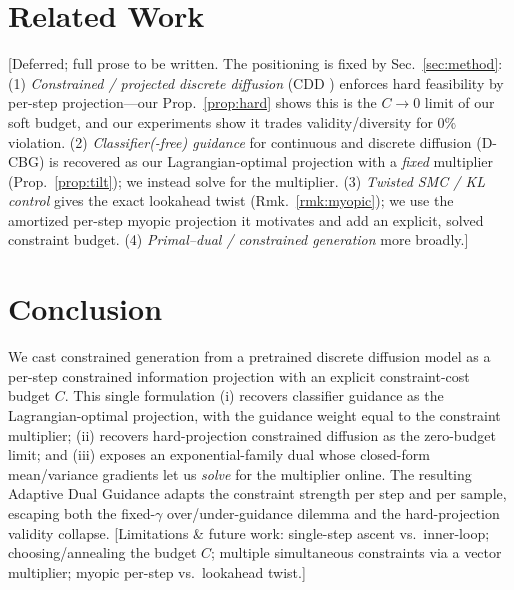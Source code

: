 \documentclass{article}
\newcommand{\todo}[1]{{\color{red}[#1]}}
\begin{document}
\section{Related Work}
\todo{Deferred; full prose to be written. The positioning is fixed by Sec.~\ref{sec:method}: (1) \emph{Constrained / projected discrete diffusion} (CDD \cite{cardei2025cdd}) enforces hard feasibility by per-step projection---our Prop.~\ref{prop:hard} shows this is the $C\to0$ limit of our soft budget, and our experiments show it trades validity/diversity for $0\%$ violation. (2) \emph{Classifier(-free) guidance} for continuous and discrete diffusion (D-CBG) is recovered as our Lagrangian-optimal projection with a \emph{fixed} multiplier (Prop.~\ref{prop:tilt}); we instead solve for the multiplier. (3) \emph{Twisted SMC / KL control} \cite{wu2023practical,zhao2024probabilistic} gives the exact lookahead twist (Rmk.~\ref{rmk:myopic}); we use the amortized per-step myopic projection it motivates and add an explicit, solved constraint budget. (4) \emph{Primal--dual / constrained generation} more broadly.}

\section{Conclusion}
We cast constrained generation from a pretrained discrete diffusion model as a per-step constrained information projection with an explicit constraint-cost budget $C$. This single formulation (i) recovers classifier guidance as the Lagrangian-optimal projection, with the guidance weight equal to the constraint multiplier; (ii) recovers hard-projection constrained diffusion as the zero-budget limit; and (iii) exposes an exponential-family dual whose closed-form mean/variance gradients let us \emph{solve} for the multiplier online. The resulting Adaptive Dual Guidance adapts the constraint strength per step and per sample, escaping both the fixed-$\gamma$ over/under-guidance dilemma and the hard-projection validity collapse. \todo{Limitations \& future work: single-step ascent vs.\ inner-loop; choosing/annealing the budget $C$; multiple simultaneous constraints via a vector multiplier; myopic per-step vs.\ lookahead twist.}
\end{document}
